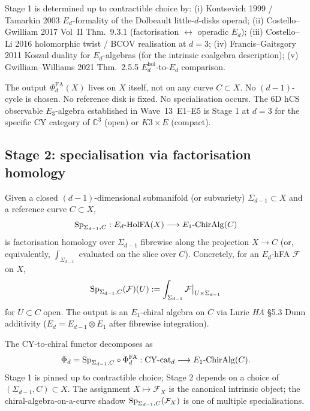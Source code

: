 \begin{theorem}\ClaimStatusTheorem
\label{wn:thm:stage-1-canonical}
Stage 1 is determined up to contractible choice by:
(i) Kontsevich 1999 / Tamarkin 2003 $E_d$-formality of the Dolbeault little-$d$-disks operad;
(ii) Costello--Gwilliam 2017 Vol~II Thm.~9.3.1 (factorisation $\leftrightarrow$ operadic $E_d$);
(iii) Costello--Li 2016 holomorphic twist / BCOV realisation at $d=3$;
(iv) Francis--Gaitsgory 2011 Koszul duality for $E_d$-algebras
(for the intrinsic coalgebra description);
(v) Gwilliam--Williams 2021 Thm.~2.5.5 $E_d^{\mathrm{hol}}$-to-$E_d$ comparison.
\end{theorem}

\begin{remark}
\label{wn:rmk:stage-1-no-curve-choice}
The output $\Phi^{\mathrm{FA}}_d(X)$ lives on $X$ itself, not on any curve
$C \subset X$. No $(d{-}1)$-cycle is chosen. No reference disk is fixed. No
specialisation occurs. The 6D hCS observable $E_3$-algebra established in
Wave~13~E1--E5 is Stage 1 at $d=3$ for the specific CY category of
$\mathbb{C}^3$ (open) or $K3 \times E$ (compact).
\end{remark}

\subsection{Stage 2: specialisation via factorisation homology}
\label{wn:subsec:stage-2-specialisation}

\begin{definition}\ClaimStatusDefinition
\label{wn:def:stage-2-specialisation}
Given a closed $(d{-}1)$-dimensional submanifold (or subvariety)
$\Sigma_{d-1} \subset X$ and a reference curve $C \subset X$,
$$
\mathrm{Sp}_{\Sigma_{d-1},C}: E_d\text{-}\mathrm{HolFA}(X) \longrightarrow E_1\text{-}\mathrm{ChirAlg}(C)
$$
is factorisation homology over $\Sigma_{d-1}$ fibrewise along the projection
$X \to C$ (or, equivalently, $\int_{\Sigma_{d-1}}$ evaluated on the slice
over $C$). Concretely, for an $E_d$-hFA $\mathcal{F}$ on $X$,
$$
\mathrm{Sp}_{\Sigma_{d-1},C}(\mathcal{F})(U) := \int_{\Sigma_{d-1}} \mathcal{F}\big|_{U \times \Sigma_{d-1}}
$$
for $U \subset C$ open. The output is an $E_1$-chiral algebra on $C$ via
Lurie \emph{HA} §5.3 Dunn additivity ($E_d = E_{d-1} \otimes E_1$ after
fibrewise integration).
\end{definition}

\begin{definition}\ClaimStatusDefinition
\label{wn:def:Phi-d-composite}
The CY-to-chiral functor decomposes as
$$
\Phi_d = \mathrm{Sp}_{\Sigma_{d-1},C} \circ \Phi^{\mathrm{FA}}_d :
\mathrm{CY}\text{-cat}_d \longrightarrow E_1\text{-}\mathrm{ChirAlg}(C).
$$
Stage 1 is pinned up to contractible choice; Stage 2 depends on a choice of
$(\Sigma_{d-1}, C) \subset X$. The assignment $X \mapsto \mathcal{F}_X$ is
the canonical intrinsic object; the chiral-algebra-on-a-curve shadow
$\mathrm{Sp}_{\Sigma_{d-1},C}(\mathcal{F}_X)$ is one of multiple specialisations.
\end{definition}


